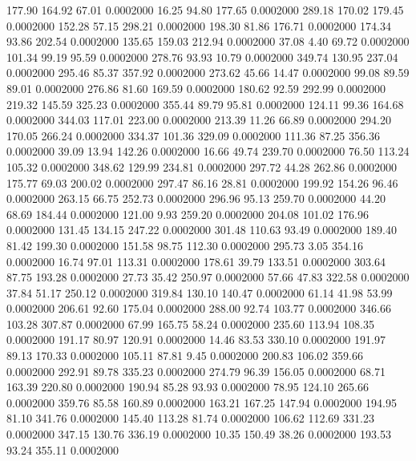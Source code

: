  177.90  164.92   67.01   0.0002000
  16.25   94.80  177.65   0.0002000
 289.18  170.02  179.45   0.0002000
 152.28   57.15  298.21   0.0002000
 198.30   81.86  176.71   0.0002000
 174.34   93.86  202.54   0.0002000
 135.65  159.03  212.94   0.0002000
  37.08    4.40   69.72   0.0002000
 101.34   99.19   95.59   0.0002000
 278.76   93.93   10.79   0.0002000
 349.74  130.95  237.04   0.0002000
 295.46   85.37  357.92   0.0002000
 273.62   45.66   14.47   0.0002000
  99.08   89.59   89.01   0.0002000
 276.86   81.60  169.59   0.0002000
 180.62   92.59  292.99   0.0002000
 219.32  145.59  325.23   0.0002000
 355.44   89.79   95.81   0.0002000
 124.11   99.36  164.68   0.0002000
 344.03  117.01  223.00   0.0002000
 213.39   11.26   66.89   0.0002000
 294.20  170.05  266.24   0.0002000
 334.37  101.36  329.09   0.0002000
 111.36   87.25  356.36   0.0002000
  39.09   13.94  142.26   0.0002000
  16.66   49.74  239.70   0.0002000
  76.50  113.24  105.32   0.0002000
 348.62  129.99  234.81   0.0002000
 297.72   44.28  262.86   0.0002000
 175.77   69.03  200.02   0.0002000
 297.47   86.16   28.81   0.0002000
 199.92  154.26   96.46   0.0002000
 263.15   66.75  252.73   0.0002000
 296.96   95.13  259.70   0.0002000
  44.20   68.69  184.44   0.0002000
 121.00    9.93  259.20   0.0002000
 204.08  101.02  176.96   0.0002000
 131.45  134.15  247.22   0.0002000
 301.48  110.63   93.49   0.0002000
 189.40   81.42  199.30   0.0002000
 151.58   98.75  112.30   0.0002000
 295.73    3.05  354.16   0.0002000
  16.74   97.01  113.31   0.0002000
 178.61   39.79  133.51   0.0002000
 303.64   87.75  193.28   0.0002000
  27.73   35.42  250.97   0.0002000
  57.66   47.83  322.58   0.0002000
  37.84   51.17  250.12   0.0002000
 319.84  130.10  140.47   0.0002000
  61.14   41.98   53.99   0.0002000
 206.61   92.60  175.04   0.0002000
 288.00   92.74  103.77   0.0002000
 346.66  103.28  307.87   0.0002000
  67.99  165.75   58.24   0.0002000
 235.60  113.94  108.35   0.0002000
 191.17   80.97  120.91   0.0002000
  14.46   83.53  330.10   0.0002000
 191.97   89.13  170.33   0.0002000
 105.11   87.81    9.45   0.0002000
 200.83  106.02  359.66   0.0002000
 292.91   89.78  335.23   0.0002000
 274.79   96.39  156.05   0.0002000
  68.71  163.39  220.80   0.0002000
 190.94   85.28   93.93   0.0002000
  78.95  124.10  265.66   0.0002000
 359.76   85.58  160.89   0.0002000
 163.21  167.25  147.94   0.0002000
 194.95   81.10  341.76   0.0002000
 145.40  113.28   81.74   0.0002000
 106.62  112.69  331.23   0.0002000
 347.15  130.76  336.19   0.0002000
  10.35  150.49   38.26   0.0002000
 193.53   93.24  355.11   0.0002000
